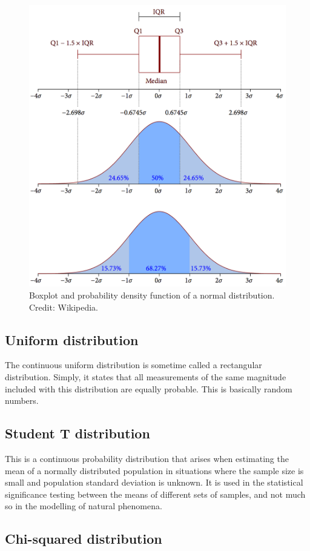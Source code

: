 \documentclass[english,10pt,a4paper,oneside]{book}
\theoremstyle{definition}
\theoremstyle{definition}
\theoremstyle{definition}
\theoremstyle{remark}
\begin{document}
\begin{figure}[h!]
\begin{center}
\includegraphics[width=0.7\linewidth]{figures/Boxplot_vs_PDF.png}
\end{center}
\caption{Boxplot and probability density function of a normal distribution. Credit: Wikipedia.}
\end{figure}

\subsection{Uniform distribution}\label{uniform-distribution}

The continuous uniform distribution is sometime called a rectangular
distribution. Simply, it states that all measurements of the same
magnitude included with this distribution are equally probable. This is
basically random numbers.

\subsection{Student T distribution}\label{student-t-distribution}

This is a continuous probability distribution that arises when
estimating the mean of a normally distributed population in situations
where the sample size is small and population standard deviation is
unknown. It is used in the statistical significance testing between the
means of different sets of samples, and not much so in the modelling of
natural phenomena.

\subsection{Chi-squared distribution}\label{chi-squared-distribution}
\end{document}
